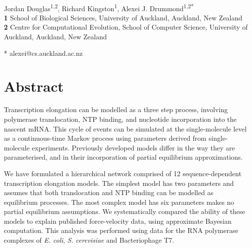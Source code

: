\documentclass[10pt,letterpaper]{article}
\begin{document}
\vspace*{0.2in}

\begin{flushleft}
{\Large
\textbf{} %
}
\newline
\\
Jordan Douglas\textsuperscript{1,2},
Richard Kingston\textsuperscript{1},
Alexei J. Drummond\textsuperscript{1,2*}
\\
\bigskip
\textbf{1} School of Biological Sciences, University of Auckland, Auckland, New Zealand
\\
\textbf{2} Centre for Computational Evolution, School of Computer Science, University of Auckland, Auckland, New Zealand
\\
\bigskip


* alexei@cs.auckland.ac.nz


\end{flushleft}
\section*{Abstract}

Transcription elongation can be modelled as a three step process, involving polymerase translocation, NTP binding, and nucleotide incorporation into the nascent mRNA. This cycle of events can be simulated at the single-molecule level as a continuous-time Markov process using parameters derived from single-molecule experiments. Previously developed models differ in the way they are parameterised, and in their incorporation of partial equilibrium approximations.

We have formulated a hierarchical network comprised of 12 sequence-dependent transcription elongation models. The simplest model has two parameters and assumes that both translocation and NTP binding can be modelled as equilibrium processes. The most complex model has six parameters makes no partial equilibrium assumptions. We systematically compared the ability of these models to explain published force-velocity data, using approximate Bayesian computation. This analysis was performed using data for the RNA polymerase complexes of \textit{ E. coli}, \textit{ S. cerevisiae} and Bacteriophage T7.
\end{document}
